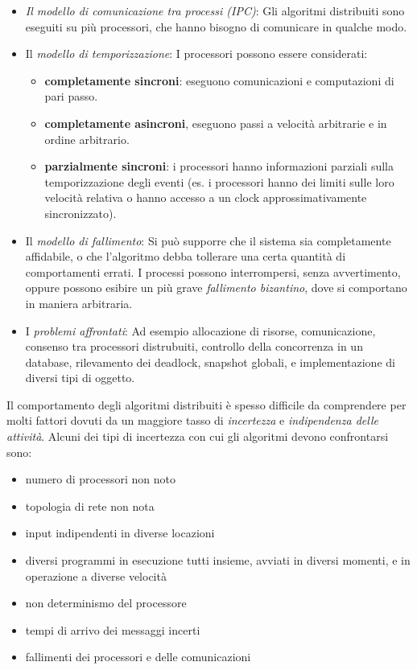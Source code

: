 \documentclass[italian,]{book}
\providecommand{\tightlist}{%
  \setlength{\itemsep}{0pt}\setlength{\parskip}{0pt}}
\begin{document}
\begin{itemize}
\item
  \emph{Il modello di comunicazione tra processi (IPC)}: Gli algoritmi
  distribuiti sono eseguiti su più processori, che hanno bisogno di
  comunicare in qualche modo.
\item
  Il \emph{modello di temporizzazione}: I processori possono essere
  considerati:

  \begin{itemize}
  \item
    \textbf{completamente sincroni}: eseguono comunicazioni e
    computazioni di pari passo.
  \item
    \textbf{completamente asincroni}, eseguono passi a velocità
    arbitrarie e in ordine arbitrario.
  \item
    \textbf{parzialmente sincroni}: i processori hanno informazioni
    parziali sulla temporizzazione degli eventi (es. i processori hanno
    dei limiti sulle loro velocità relativa o hanno accesso a un clock
    approssimativamente sincronizzato).
  \end{itemize}
\item
  Il \emph{modello di fallimento}: Si può supporre che il sistema sia
  completamente affidabile, o che l'algoritmo debba tollerare una certa
  quantità di comportamenti errati. I processi possono interrompersi,
  senza avvertimento, oppure possono esibire un più grave
  \emph{fallimento bizantino}, dove si comportano in maniera arbitraria.
\item
  I \emph{problemi affrontati}: Ad esempio allocazione di risorse,
  comunicazione, consenso tra processori distrubuiti, controllo della
  concorrenza in un database, rilevamento dei deadlock, snapshot
  globali, e implementazione di diversi tipi di oggetto.
\end{itemize}

Il comportamento degli algoritmi distribuiti è spesso difficile da
comprendere per molti fattori dovuti da un maggiore tasso di
\emph{incertezza} e \emph{indipendenza delle attività}. Alcuni dei tipi
di incertezza con cui gli algoritmi devono confrontarsi sono:

\begin{itemize}
\tightlist
\item
  numero di processori non noto
\item
  topologia di rete non nota
\item
  input indipendenti in diverse locazioni
\item
  diversi programmi in esecuzione tutti insieme, avviati in diversi
  momenti, e in operazione a diverse velocità
\item
  non determinismo del processore
\item
  tempi di arrivo dei messaggi incerti
\item
  fallimenti dei processori e delle comunicazioni
\end{itemize}
\end{document}
